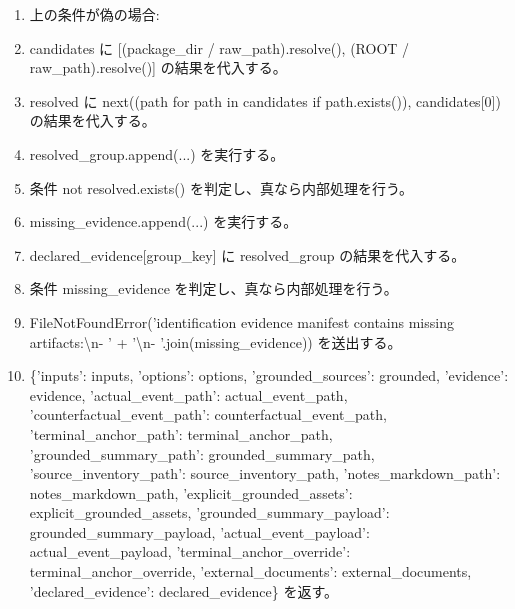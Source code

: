 \documentclass[a4paper,11pt]{article}
\begin{document}
\begin{enumerate}[leftmargin=1.8em]
\item       上の条件が偽の場合:
\item       candidates に [(package\_dir / raw\_path).resolve(), (ROOT / raw\_path).resolve()] の結果を代入する。
\item       resolved に next((path for path in candidates if path.exists()), candidates[0]) の結果を代入する。
\item     resolved\_group.append(...) を実行する。
\item     条件 not resolved.exists() を判定し、真なら内部処理を行う。
\item       missing\_evidence.append(...) を実行する。
\item   declared\_evidence[group\_key] に resolved\_group の結果を代入する。
\item 条件 missing\_evidence を判定し、真なら内部処理を行う。
\item   FileNotFoundError('identification evidence manifest contains missing artifacts:\textbackslash{}n- ' + '\textbackslash{}n- '.join(missing\_evidence)) を送出する。
\item \{'inputs': inputs, 'options': options, 'grounded\_sources': grounded, 'evidence': evidence, 'actual\_event\_path': actual\_event\_path, 'counterfactual\_event\_path': counterfactual\_event\_path, 'terminal\_anchor\_path': terminal\_anchor\_path, 'grounded\_summary\_path': grounded\_summary\_path, 'source\_inventory\_path': source\_inventory\_path, 'notes\_markdown\_path': notes\_markdown\_path, 'explicit\_grounded\_assets': explicit\_grounded\_assets, 'grounded\_summary\_payload': grounded\_summary\_payload, 'actual\_event\_payload': actual\_event\_payload, 'terminal\_anchor\_override': terminal\_anchor\_override, 'external\_documents': external\_documents, 'declared\_evidence': declared\_evidence\} を返す。
            \end{enumerate}
\end{document}
